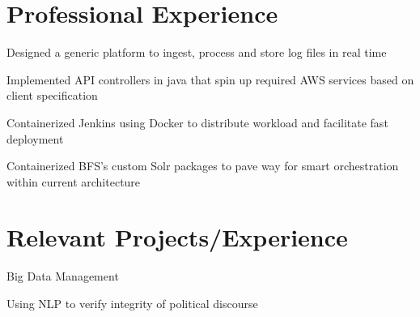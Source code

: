 \documentclass[]{resume_openfont}
\begin{document}
\begin{minipage}[t]{0.66\textwidth} 


\section{Professional Experience}

\vspace{\topsep} %
\begin{tightemize}
\item Designed a generic platform to ingest, process and store log files in real time
\item Implemented API controllers in java that spin up required AWS services based on client specification
\end{tightemize}
\sectionsep

\begin{tightemize}
\item Containerized Jenkins using Docker to distribute workload and facilitate fast deployment
\item Containerized BFS’s custom Solr packages to pave way for smart orchestration within current architecture
\end{tightemize}
\sectionsep


\section{Relevant Projects/Experience}

\begin{tightemize}
\item Big Data Management
\item Using NLP to verify integrity of political discourse
\end{tightemize}
\sectionsep


\end{minipage}
\end{document}
